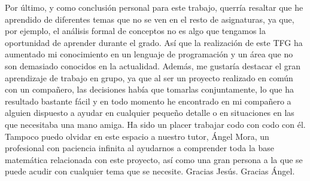 Por \'ultimo, y como conclusi\'on personal para este trabajo, querr\'ia resaltar que he aprendido de diferentes temas que no se ven en el resto de asignaturas, ya que, 
por ejemplo, el an\'alisis formal de conceptos no es algo que tengamos la oportunidad de aprender durante el grado. As\'i que la realizaci\'on 
de este TFG ha aumentado mi conocimiento en un lenguaje de programaci\'on y un \'area que no son demasiado conocidos en la actualidad. 
Adem\'as, me gustar\'ia destacar el gran aprendizaje de trabajo en grupo, ya que al ser 
un proyecto realizado en com\'un con un compa\~nero, las decisiones hab\'ia que tomarlas conjuntamente, lo que ha resultado bastante f\'acil y 
en todo momento he encontrado en mi compa\~nero a alguien dispuesto a ayudar en cualquier peque\~no detalle o en situaciones en las que 
necesitaba una mano amiga. Ha sido un placer trabajar codo con codo con \'el. Tampoco puedo olvidar en este espacio a nuestro tutor, \'Angel Mora, 
un profesional con paciencia infinita al ayudarnos a comprender toda la base matem\'atica relacionada con este proyecto, as\'i 
como una gran persona a la que se puede acudir con cualquier tema que se necesite. Gracias Jes\'us. Gracias \'Angel.

